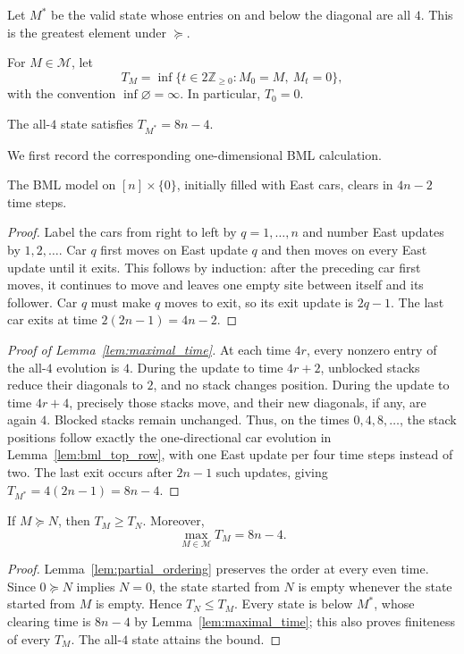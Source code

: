\documentclass[reqno]{amsart}
\begin{document}
Let $M^*$ be the valid state whose entries on and below the diagonal
are all $4$. This is the greatest element under $\succeq$.

For $M\in\mathcal M$, let
\[
 T_M=\inf\{t\in2\mathbb Z_{\geq0}:M_0=M,\ M_t=0\},
\]
with the convention $\inf\varnothing=\infty$. In particular, $T_0=0$.

\begin{lemma}\label{lem:maximal_time}
The all-$4$ state satisfies $T_{M^*}=8n-4$.
\end{lemma}

We first record the corresponding one-dimensional BML calculation.
\begin{lemma}\label{lem:bml_top_row}
The BML model on $[n]\times\{0\}$, initially filled with East cars,
clears in $4n-2$ time steps.
\end{lemma}
\begin{proof}
Label the cars from right to left by $q=1,\ldots,n$ and number East
updates by $1,2,\ldots$. Car $q$ first moves on East update $q$ and then
moves on every East update until it exits. This follows by induction:
after the preceding car first moves, it continues to move and leaves
one empty site between itself and its follower. Car $q$ must make $q$
moves to exit, so its exit update is $2q-1$. The last car exits at
time $2(2n-1)=4n-2$.
\end{proof}

\begin{proof}[Proof of Lemma~\ref{lem:maximal_time}]
At each time $4r$, every nonzero entry of the all-$4$ evolution is $4$.
During the update to time $4r+2$, unblocked stacks reduce their diagonals
to $2$, and no stack changes position. During the update to time
$4r+4$, precisely those stacks move, and their new diagonals, if any,
are again $4$. Blocked stacks remain unchanged. Thus, on the times
$0,4,8,\ldots$, the stack positions follow exactly the one-directional
car evolution in Lemma~\ref{lem:bml_top_row}, with one East update per
four time steps instead of two. The last exit occurs after $2n-1$
such updates, giving $T_{M^*}=4(2n-1)=8n-4$.
\end{proof}

\begin{lemma}\label{lem:TRM_bound}
If $M\succeq N$, then $T_M\geq T_N$. Moreover,
\[
    \max_{M\in\mathcal M}T_M=8n-4.
\]
\end{lemma}
\begin{proof}
Lemma~\ref{lem:partial_ordering} preserves the order at every even time.
Since $0\succeq N$ implies $N=0$, the state started from $N$ is empty
whenever the state started from $M$ is empty. Hence $T_N\leq T_M$.
Every state is below $M^*$, whose clearing time is $8n-4$ by
Lemma~\ref{lem:maximal_time}; this also proves finiteness of every
$T_M$. The all-$4$ state attains the bound.
\end{proof}
\end{document}
